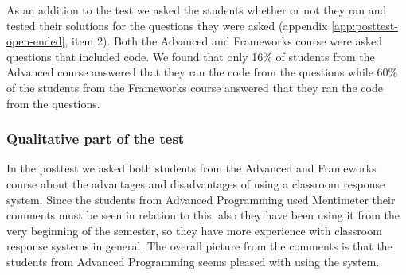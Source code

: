 As an addition to the test we asked the students whether or not they ran and tested their solutions for the questions they were asked (appendix \ref{app:posttest-open-ended}, item 2). Both the Advanced and Frameworks course were asked questions that included code. We found that only 16\% of students from the Advanced course answered that they ran the code from the questions while 60\% of the students from the Frameworks course answered that they ran the code from the questions. 






\subsubsection*{Qualitative part of the test}
In the posttest we asked both students from the Advanced and Frameworks course about the advantages and disadvantages of using a classroom response system. Since the students from Advanced Programming used Mentimeter their comments must be seen in relation to this, also they have been using it from the very beginning of the semester, so they have more experience with classroom response systems in general. The overall picture from the comments is that the students from Advanced Programming seems pleased with using the system.

